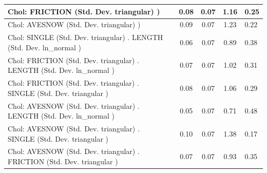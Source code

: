 \begin{table}
\begin{center}
\begin{tabular}{|l|l|c|c|c|l|}
			\hline
			 Chol: FRICTION (Std. Dev. triangular) ) &  & 0.08 & 0.07 & 1.16 & 0.25 \\
			\hline
			 Chol: AVESNOW (Std. Dev. triangular) ) &  & 0.09 & 0.07 & 1.23 & 0.22 \\
			\hline
			 Chol: SINGLE (Std. Dev. triangular) . LENGTH (Std. Dev.   ln_normal ) &  & 0.06 & 0.07 & 0.89 & 0.38 \\
			\hline
			 Chol: FRICTION (Std. Dev. triangular) . LENGTH (Std. Dev.   ln_normal ) &  & 0.07 & 0.07 & 1.02 & 0.31 \\
			\hline
			 Chol: FRICTION (Std. Dev. triangular) . SINGLE (Std. Dev.   triangular ) &  & 0.08 & 0.07 & 1.06 & 0.29 \\
			\hline
			 Chol: AVESNOW (Std. Dev. triangular) . LENGTH (Std. Dev.   ln_normal ) &  & 0.05 & 0.07 & 0.71 & 0.48 \\
			\hline
			 Chol: AVESNOW (Std. Dev. triangular) . SINGLE (Std. Dev.   triangular ) &  & 0.10 & 0.07 & 1.38 & 0.17 \\
			\hline
			 Chol: AVESNOW (Std. Dev. triangular) . FRICTION (Std. Dev.   triangular ) &  & 0.07 & 0.07 & 0.93 & 0.35 \\
			\hline
		\end{tabular}
	\end{center}
\end{table}